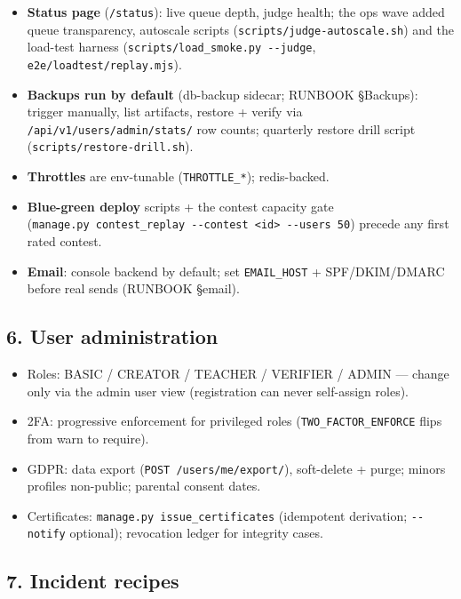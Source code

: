 \documentclass[
]{article}
\providecommand{\tightlist}{%
  \setlength{\itemsep}{0pt}\setlength{\parskip}{0pt}}
\begin{document}
\begin{itemize}
\tightlist
\item
  \textbf{Status page} (\texttt{/status}): live queue depth, judge
  health; the ops wave added queue transparency, autoscale scripts
  (\texttt{scripts/judge-autoscale.sh}) and the load-test harness
  (\texttt{scripts/load\_smoke.py\ -\/-judge},
  \texttt{e2e/loadtest/replay.mjs}).
\item
  \textbf{Backups run by default} (db-backup sidecar; RUNBOOK §Backups):
  trigger manually, list artifacts, restore + verify via
  \texttt{/api/v1/users/admin/stats/} row counts; quarterly restore
  drill script (\texttt{scripts/restore-drill.sh}).
\item
  \textbf{Throttles} are env-tunable (\texttt{THROTTLE\_*});
  redis-backed.
\item
  \textbf{Blue-green deploy} scripts + the contest capacity gate
  (\texttt{manage.py\ contest\_replay\ -\/-contest\ \textless{}id\textgreater{}\ -\/-users\ 50})
  precede any first rated contest.
\item
  \textbf{Email}: console backend by default; set \texttt{EMAIL\_HOST} +
  SPF/DKIM/DMARC before real sends (RUNBOOK §email).
\end{itemize}

\subsection{6. User administration}\label{6-user-administration}

\begin{itemize}
\tightlist
\item
  Roles: BASIC / CREATOR / TEACHER / VERIFIER / ADMIN --- change only
  via the admin user view (registration can never self-assign roles).
\item
  2FA: progressive enforcement for privileged roles
  (\texttt{TWO\_FACTOR\_ENFORCE} flips from warn to require).
\item
  GDPR: data export (\texttt{POST\ /users/me/export/}), soft-delete +
  purge; minors\textquotesingle{} profiles non-public; parental consent
  dates.
\item
  Certificates: \texttt{manage.py\ issue\_certificates} (idempotent
  derivation; \texttt{-\/-notify} optional); revocation ledger for
  integrity cases.
\end{itemize}

\subsection{7. Incident recipes}\label{7-incident-recipes}
\end{document}
